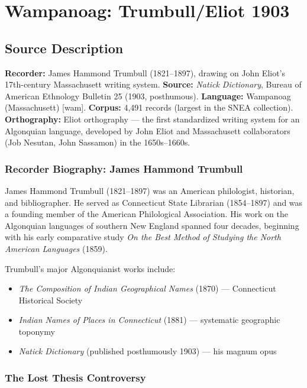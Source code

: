 
\section{Wampanoag: Trumbull/Eliot 1903}
\label{sec:1363}

\subsection{Source Description}

\textbf{Recorder:} James Hammond Trumbull (1821--1897), drawing on John Eliot's
17th-century Massachusett writing system.
\textbf{Source:} \emph{Natick Dictionary}, Bureau of American Ethnology
Bulletin 25 (1903, posthumous).
\textbf{Language:} Wampanoag (Massachusett) [wam].
\textbf{Corpus:} 4,491 records (largest in the SNEA collection).
\textbf{Orthography:} Eliot orthography --- the first standardized writing
system for an Algonquian language, developed by John Eliot and Massachusett
collaborators (Job Nesutan, John Sassamon) in the 1650s--1660s.

\subsubsection{Recorder Biography: James Hammond Trumbull}

James Hammond Trumbull (1821--1897) was an American philologist, historian,
and bibliographer. He served as Connecticut State Librarian (1854--1897) and
was a founding member of the American Philological Association. His work on
the Algonquian languages of southern New England spanned four decades,
beginning with his early comparative study \emph{On the Best Method of
Studying the North American Languages} (1859).

Trumbull's major Algonquianist works include:
\begin{itemize}
  \item \emph{The Composition of Indian Geographical Names} (1870) ---
    Connecticut Historical Society
  \item \emph{Indian Names of Places in Connecticut} (1881) --- systematic
    geographic toponymy
  \item \emph{Natick Dictionary} (published posthumously 1903) --- his
    magnum opus
\end{itemize}

\subsubsection{The Lost Thesis Controversy}

